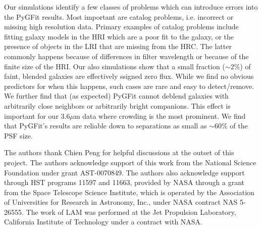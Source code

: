 \documentclass[preprint]{aastex}
\newcommand{\galfit}{GALFIT}
\newcommand{\pygfit}{PyGFit}
\begin{document}
Our simulations identify a few classes of problems which can introduce errors into the \pygfit{} results.  Most important are catalog problems, i.e. incorrect or missing high resolution data.  Primary examples of catalog problems include fitting galaxy models in the HRI which are a poor fit to the galaxy, or the presence of objects in the LRI that are missing from the HRC.  The latter commonly happens because of differences in filter wavelength or because of the finite size of the HRI.
Our also simulations show that a small fraction ($\sim2\%$) of faint, blended galaxies are effectively ssigned zero flux.  While we find no obvious predictors for when this happens, such cases are rare and easy to detect/remove.  We further find that (as expected) \pygfit{} cannot deblend galaxies with arbitrarily close neighbors or arbitrarily bright companions.  This effect is important for our $3.6\mu$m data where crowding is the most prominent.  We find that \pygfit{}'s results are reliable down to separations as small as $\sim60\%$ of the PSF size.  


\acknowledgements

The authors thank Chien Peng for helpful discussions at the outset of this project. The authors acknowledge support of this work from the National Science Foundation under grant AST-0070849.
The authors also acknowledge support through HST programs 11597 and 11663, 
provided by NASA through a grant from the Space Telescope
Science Institute, which is operated by the Association of
Universities for Research in Astronomy, Inc., under NASA
contract NAS 5-26555.
The work of LAM was performed at the Jet Propulsion Laboratory, California Institute of Technology under a contract with NASA.







\begin{figure*}
\caption{A flow chart of \pygfit{}'s procedure.  Rectangles denote computational processes executed by \pygfit{} while the page symbols denote data products created by or used by \pygfit{}.  The five data products along the top are inputs which must be provided to \pygfit{}.}\label{fig:flow_chart}
\end{figure*}

\begin{figure*}
\caption{Original images (top row) and residuals (bottom row) from our \galfit{} and \pygfit{} runs in the core of a high redshift ($z=1.243$) galaxy cluster.  From left to right the images correspond to WFC3/F160W, R, H, and $4.5\mu$m.  The WFC3/F160W image was fit with \galfit{}, while all other bands were fit with \pygfit{}.  All panels show the same field of view, and the scale in the top left panel is 10$^{\prime\prime}$ long.}\label{fig:residuals}
\end{figure*}
\end{document}
